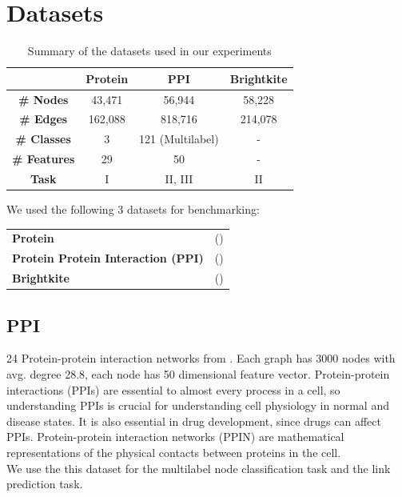 \documentclass[sigconf]{acmart}
\begin{document}
\newpage
\section{Datasets}

\begin{table}[b!]
\begin{center}
\begin{tabular}{ c|c|c|c } 
  & \textbf{Protein} & \textbf{PPI} & \textbf{Brightkite}  \\ 
 \hline
\textbf{\# Nodes} & 43,471 & 56,944 & 58,228\\ 
\textbf{\# Edges} & 162,088 & 818,716 & 214,078 \\
\textbf{\# Classes} & 3 & 121 (Multilabel) & - \\
\textbf{\# Features} & 29 & 50 & - \\
\textbf{ Task} & I & II, III & II \\
\end{tabular}
\end{center}
\caption{\textmd{Summary of the datasets used in our experiments}}
\label{tab:tab1}
\end{table}

We used the following 3 datasets for benchmarking:
\begin{center}
\begin{tabular}{l l}
\textbf{Protein} & (\citet{10.1093/bioinformatics/bti1007})\\
\textbf{Protein Protein Interaction (PPI)} & (\citet{Zitnik2017}) \\
\textbf{Brightkite} & (\citet{cho2011friendship})
\end{tabular}
\end{center}
  
\subsection{PPI}

24 Protein-protein interaction networks from \citet{Zitnik2017}. Each graph has 3000 nodes with avg. degree 28.8, each node has 50 dimensional feature vector.  Protein-protein interactions (PPIs) are essential to almost every process in a cell, so understanding PPIs is crucial for understanding cell physiology in normal and disease states. It is also essential in drug development, since drugs can affect PPIs. Protein-protein interaction networks (PPIN) are mathematical representations of the physical contacts between proteins in the cell. \\
We use the this dataset for the multilabel node classification task and the link prediction task.
\end{document}
